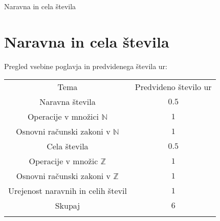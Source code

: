 \begin{priprava}{0}{}{}{Naravna in cela števila}{}{}
    
    \chapter{Naravna in cela števila}

    \Large{Pregled vsebine poglavja in predvidenega števila ur:}

    \begin{table}[H]
        \centering
        \begin{tabular}{||c|c||} 
        \hhline{|t:==:t|}
        \rowcolor[rgb]{0.843,0.718,0.718} 
        Tema  & Predvideno število ur   \\ 
        \hhline{|:==:|}
        Naravna števila & $0.5$    \\ 
        \hline
        Operacije v množici $\mathbb{N}$ & $1$    \\ 
        \hline
        Osnovni računski zakoni v $\mathbb{N}$ & $1$    \\ 
        \hline
        Cela števila & $0.5$     \\
        \hline
        Operacije v množic $\mathbb{Z}$ & $1$     \\
        \hline
        Osnovni računski zakoni v $\mathbb{Z}$ & $1$    \\ 
        \hline
        Urejenost naravnih in celih števil & $1$    \\ 
        \hhline{|:==:|}
        Skupaj & $6$     \\
        \hhline{|b:==:b|}
        \end{tabular}
    \end{table}


    
\end{priprava}
